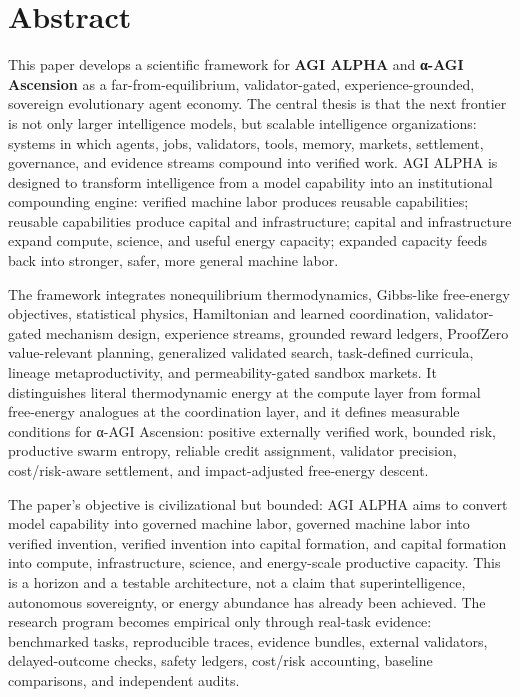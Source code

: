 \documentclass[11pt]{article}
\begin{document}
\section{Abstract}\label{abstract}

This paper develops a scientific framework for \textbf{AGI ALPHA} and \textbf{α-AGI Ascension} as a far-from-equilibrium, validator-gated, experience-grounded, sovereign evolutionary agent economy. The central thesis is that the next frontier is not only larger intelligence models, but scalable intelligence organizations: systems in which agents, jobs, validators, tools, memory, markets, settlement, governance, and evidence streams compound into verified work. AGI ALPHA is designed to transform intelligence from a model capability into an institutional compounding engine: verified machine labor produces reusable capabilities; reusable capabilities produce capital and infrastructure; capital and infrastructure expand compute, science, and useful energy capacity; expanded capacity feeds back into stronger, safer, more general machine labor.

The framework integrates nonequilibrium thermodynamics, Gibbs-like free-energy objectives, statistical physics, Hamiltonian and learned coordination, validator-gated mechanism design, experience streams, grounded reward ledgers, ProofZero value-relevant planning, generalized validated search, task-defined curricula, lineage metaproductivity, and permeability-gated sandbox markets. It distinguishes literal thermodynamic energy at the compute layer from formal free-energy analogues at the coordination layer, and it defines measurable conditions for α-AGI Ascension: positive externally verified work, bounded risk, productive swarm entropy, reliable credit assignment, validator precision, cost/risk-aware settlement, and impact-adjusted free-energy descent.

The paper's objective is civilizational but bounded: AGI ALPHA aims to convert model capability into governed machine labor, governed machine labor into verified invention, verified invention into capital formation, and capital formation into compute, infrastructure, science, and energy-scale productive capacity. This is a horizon and a testable architecture, not a claim that superintelligence, autonomous sovereignty, or energy abundance has already been achieved. The research program becomes empirical only through real-task evidence: benchmarked tasks, reproducible traces, evidence bundles, external validators, delayed-outcome checks, safety ledgers, cost/risk accounting, baseline comparisons, and independent audits.
\end{document}
